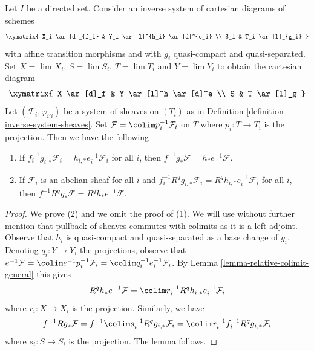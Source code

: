\begin{lemma}
\label{lemma-base-change-Rf-star-colim}
Let $I$ be a directed set. Consider an inverse system of
cartesian diagrams of schemes
$$
\xymatrix{
X_i \ar[d]_{f_i} & Y_i \ar[l]^{h_i} \ar[d]^{e_i} \\
S_i & T_i \ar[l]_{g_i}
}
$$
with affine transition morphisms and with $g_i$ quasi-compact and
quasi-separated. Set $X = \lim X_i$,
$S = \lim S_i$, $T = \lim T_i$ and $Y = \lim Y_i$ to
obtain the cartesian diagram
$$
\xymatrix{
X \ar[d]_f & Y \ar[l]^h \ar[d]^e \\
S & T \ar[l]_g
}
$$
Let $(\mathcal{F}_i, \varphi_{i'i})$ be a system of sheaves on
$(T_i)$ as in Definition \ref{definition-inverse-system-sheaves}. Set
$\mathcal{F} = \colim p_i^{-1}\mathcal{F}_i$ on $T$
where $p_i : T \to T_i$ is the projection.
Then we have the following
\begin{enumerate}
\item If $f_i^{-1}g_{i, *}\mathcal{F}_i = h_{i, *}e_i^{-1}\mathcal{F}_i$
for all $i$, then
$f^{-1}g_*\mathcal{F} = h_*e^{-1}\mathcal{F}$.
\item If $\mathcal{F}_i$ is an abelian sheaf for all $i$ and
$f_i^{-1}R^qg_{i, *}\mathcal{F}_i = R^qh_{i, *}e_i^{-1}\mathcal{F}_i$
for all $i$, then
$f^{-1}R^qg_*\mathcal{F} = R^qh_*e^{-1}\mathcal{F}$.
\end{enumerate}
\end{lemma}

\begin{proof}
We prove (2) and we omit the proof of (1). We will use without further
mention that pullback of sheaves commutes with colimits as it is a
left adjoint. Observe that $h_i$ is quasi-compact and quasi-separated as a
base change of $g_i$.
Denoting $q_i : Y \to Y_i$ the projections, observe that
$e^{-1}\mathcal{F} = \colim e^{-1}p_i^{-1}\mathcal{F}_i =
\colim q_i^{-1}e_i^{-1}\mathcal{F}_i$.
By Lemma \ref{lemma-relative-colimit-general}
this gives
$$
R^qh_*e^{-1}\mathcal{F} = \colim r_i^{-1}R^qh_{i, *}e_i^{-1}\mathcal{F}_i
$$
where $r_i : X \to X_i$ is the projection.
Similarly, we have
$$
f^{-1}Rg_*\mathcal{F} =
f^{-1}\colim s_i^{-1}R^qg_{i, *}\mathcal{F}_i =
\colim r_i^{-1}f_i^{-1}R^qg_{i, *}\mathcal{F}_i
$$
where $s_i : S \to S_i$ is the projection. The lemma follows.
\end{proof}
